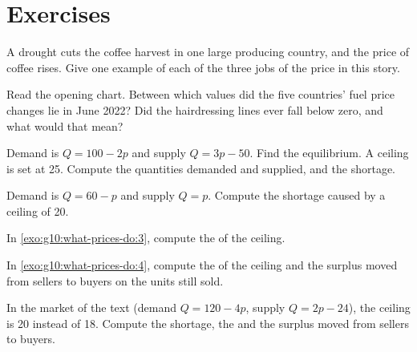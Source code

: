 \section{Exercises}

\begin{exercise}[$\star$]\label{exo:g10:what-prices-do:1}
A drought cuts the coffee harvest in one large producing country, and the price of coffee rises. Give one example of each of the three jobs of the price in this
story.
\end{exercise}

\begin{exercise}[$\star$]\label{exo:g10:what-prices-do:2}
Read the opening chart. Between which values did the five countries' fuel price changes lie in June 2022? Did the hairdressing lines ever fall below zero, and what
would that mean?
\end{exercise}

\begin{exercise}[$\star$]\label{exo:g10:what-prices-do:3}
Demand is $Q = 100 - 2p$ and supply $Q = 3p - 50$. Find the equilibrium. A ceiling is set at 25. Compute the quantities demanded and supplied, and the shortage.
\end{exercise}

\begin{exercise}[$\star$]\label{exo:g10:what-prices-do:4}
Demand is $Q = 60 - p$ and supply $Q = p$. Compute the shortage caused by a ceiling of 20.
\end{exercise}

\begin{exercise}[$\star$]\label{exo:g10:what-prices-do:5}
In \cref{exo:g10:what-prices-do:3}, compute the  of the ceiling.
\end{exercise}

\begin{exercise}[$\star\star$]\label{exo:g10:what-prices-do:6}
In \cref{exo:g10:what-prices-do:4}, compute the  of the ceiling and the surplus moved from sellers to buyers on the units still sold.
\end{exercise}

\begin{exercise}[$\star\star$]\label{exo:g10:what-prices-do:7}
In the market of the text (demand $Q = 120 - 4p$, supply $Q = 2p - 24$), the ceiling is 20 instead of 18. Compute the shortage, the  and the surplus moved
from sellers to buyers.
\end{exercise}

